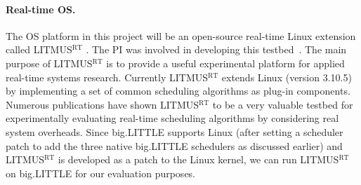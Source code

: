 \paragraph{Real-time OS.} The OS platform in this project will be an open-source real-time Linux extension called LITMUS$^{\textrm{RT}}$ \cite{LITMUS}. The PI was involved in developing this testbed~\cite{elliott1minimizing, Liudissertation}. The main purpose of LITMUS$^{\textrm{RT}}$ is to provide a useful experimental platform for applied real-time systems research. Currently LITMUS$^{\textrm{RT}}$ extends Linux (version 3.10.5) by implementing a set of common scheduling algorithms as plug-in components. Numerous  publications \cite{elliott1minimizing, elliott1minimizing, Liudissertation, BBBdissertation, clustered, calandrino2008cache, johndissertation} have shown LITMUS$^{\textrm{RT}}$ to be a very valuable testbed for experimentally evaluating real-time scheduling algorithms by considering real system overheads. 
 Since big.LITTLE supports Linux (after setting a scheduler patch to add the three native big.LITTLE schedulers as discussed earlier) and LITMUS$^{\textrm{RT}}$ is developed as a patch to the Linux kernel, we can run LITMUS$^{\textrm{RT}}$ on big.LITTLE for our evaluation purposes.